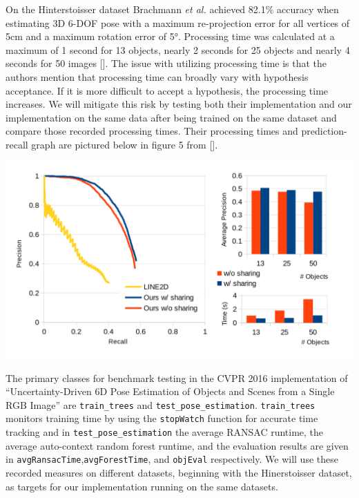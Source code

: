 \documentclass[12pt]{article}
\let\origfigure=\figure
\let\endorigfigure=\endfigure
\renewenvironment{figure}[1][]{%
  \origfigure[H]
}{%
  \endorigfigure
}
\begin{document}
On the Hinterstoisser dataset Brachmann \emph{et al.} achieved 82.1\%
accuracy when estimating 3D 6-DOF pose with a maximum re-projection
error for all vertices of 5cm and a maximum rotation error of 5°.
Processing time was calculated at a maximum of 1 second for 13 objects,
nearly 2 seconds for 25 objects and nearly 4 seconds for 50 images
{[}{]}. The issue with utilizing processing time is that the authors
mention that processing time can broadly vary with hypothesis
acceptance. If it is more difficult to accept a hypothesis, the
processing time increases. We will mitigate this risk by testing both
their implementation and our implementation on the same data after being
trained on the same dataset and compare those recorded processing times.
Their processing times and prediction-recall graph are pictured below in
figure 5 from {[}{]}.

\begin{figure}
\centering
\includegraphics{Pictures/figure5.png}
\caption{Experiment Results from Brachmann \emph{et al.}}
\end{figure}

The primary classes for benchmark testing in the CVPR 2016
implementation of ``Uncertainty-Driven 6D Pose Estimation of Objects and
Scenes from a Single RGB Image'' are \texttt{train\_trees} and
\texttt{test\_pose\_estimation}. \texttt{train\_trees} monitors training
time by using the \texttt{stopWatch} function for accurate time tracking
and in \texttt{test\_pose\_estimation} the average RANSAC runtime, the
average auto-context random forest runtime, and the evaluation results
are given in \texttt{avgRansacTime},\texttt{avgForestTime}, and
\texttt{objEval} respectively. We will use these recorded measures on
different datasets, beginning with the Hinerstoisser dataset, as targets
for our implementation running on the same datasets.
\end{document}
